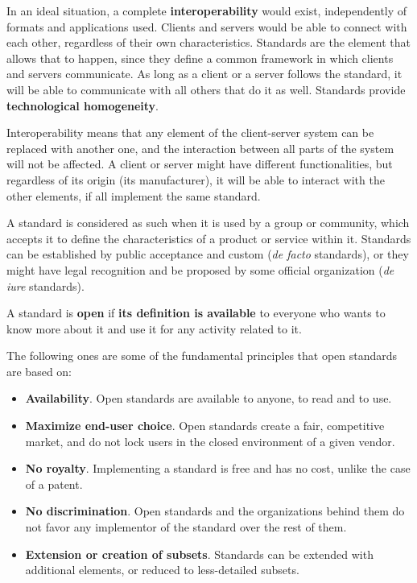 In an ideal situation, a complete \textbf{interoperability} would exist, independently of formats and applications used. Clients and servers would be able to connect with each other, regardless of their own characteristics. Standards are the element that allows that to happen, since they define a common framework in which clients and servers communicate. As long as a client or a server follows the standard, it will be able to communicate with all others that do it as well. Standards provide \textbf{technological homogeneity}.


Interoperability means that any element of the client-server system can be replaced with another one, and the interaction between all parts of the system will not  be affected. A client or server might have different functionalities, but regardless of its origin (its manufacturer), it will be able to interact with the other elements, if all implement the same standard.

A standard is considered as such when it is used by a group or community, which accepts it to define the characteristics of a product or service within it. Standards can be established by public acceptance and custom (\emph{de facto} standards), or they might have legal recognition and be proposed by some official organization (\emph{de iure} standards).

A standard is \textbf{open} if \textbf{its definition is available} to everyone who wants to know more about it and use it for any activity related to it.

The following ones are some of the fundamental principles that open standards are based on:

\begin{itemize}
	\item \textbf{Availability}. Open standards are available to anyone, to read and to use.
	\item \textbf{Maximize end-user choice}. Open standards create a fair, competitive market, and do not lock users in the closed environment of a given vendor. 
	\item \textbf{No royalty}. Implementing a standard is free and has no cost, unlike the case of a patent.
	\item \textbf{No discrimination}. Open standards and the organizations behind them do not favor any implementor of the standard over the rest of them.
	\item \textbf{Extension or creation of subsets}. Standards can be extended with additional elements, or reduced to less-detailed subsets.
\end{itemize}

